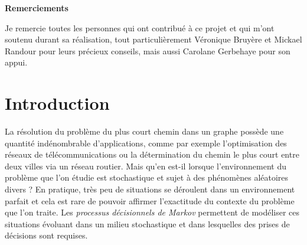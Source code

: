 \documentclass[12pt,a4paper]{report}
\theoremstyle{definition}%
\theoremstyle{remark}
\begin{document}
\shipout\null
\begin{flushright}
{\Large \textbf{Remerciements}} \\
\end{flushright}

\begin{flushright}
Je remercie toutes les personnes qui ont contribué à ce projet et qui m'ont soutenu durant sa réalisation, tout
particulièrement Véronique Bruyère et Mickael Randour pour leurs précieux
conseils, mais aussi Carolane Gerbehaye pour son appui.
\end{flushright}
\thispagestyle{empty}

\afterpage{\null\newpage}

\tableofcontents
\listoftheorems[ignoreall,show={definition,theorem}]

\afterpage{\null\newpage}

\chapter*{Introduction}
\setcounter{page}{9}
La résolution du problème du plus court chemin dans un graphe possède une quantité indénombrable d'applications, comme par exemple
l'optimisation des réseaux de télécommunications ou la détermination du chemin le
plus court entre deux villes via un réseau routier.
Mais qu'en est-il lorsque l'environnement du problème que l'on étudie est
stochastique et sujet à des phénomènes aléatoires divers ? En pratique,
très peu de situations se déroulent dans un environnement parfait et cela est
rare de pouvoir affirmer l'exactitude du contexte du problème que l'on traite.
Les \textit{processus décisionnels de Markov} permettent de modéliser ces situations
évoluant dans un milieu stochastique et dans
lesquelles des prises de décisions sont requises. \\
\end{document}
